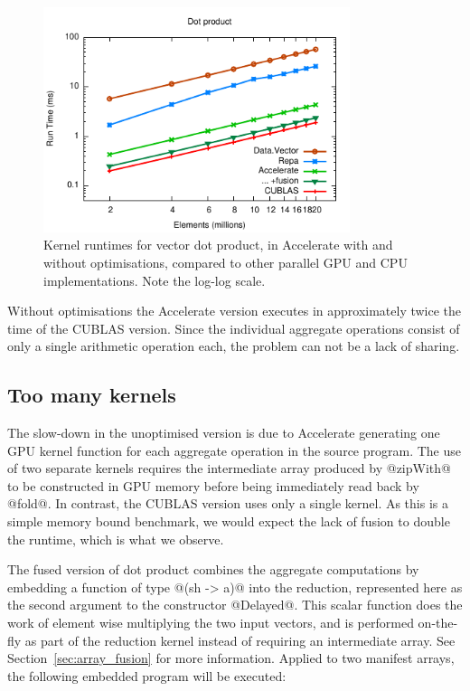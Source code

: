 \begin{figure}
    \begin{center}
        \includegraphics[width=0.8\textwidth]{images/results/dotp/dotp}
    \end{center}
    \caption[Vector dot product kernel benchmarks]{Kernel runtimes for vector
        dot product, in Accelerate with and without optimisations, compared to
        other parallel GPU and CPU implementations. Note the log-log scale.}
    \label{fig:dotp}
\end{figure}

Without optimisations the Accelerate version executes in approximately twice the
time of the CUBLAS version. Since the individual aggregate operations consist of
only a single arithmetic operation each, the problem can not be a lack of
sharing.


\subsection{Too many kernels}

The slow-down in the unoptimised version is due to Accelerate generating one GPU
kernel function for each aggregate operation in the source program. The use of
two separate kernels requires the intermediate array produced by @zipWith@ to be
constructed in GPU memory before being immediately read back by @fold@. In
contrast, the CUBLAS version uses only a single kernel. As this is a simple
memory bound benchmark, we would expect the lack of fusion to double the
runtime, which is what we observe.

The fused version of dot product combines the aggregate computations by
embedding a function of type @(sh -> a)@ into the reduction, represented
here as the second argument to the constructor @Delayed@. This scalar
function does the work of element wise multiplying the two input vectors, and is
performed on-the-fly as part of the reduction kernel instead of requiring an
intermediate array. See Section~\ref{sec:array_fusion} for more information.
Applied to two manifest arrays, the following embedded program will be executed:

